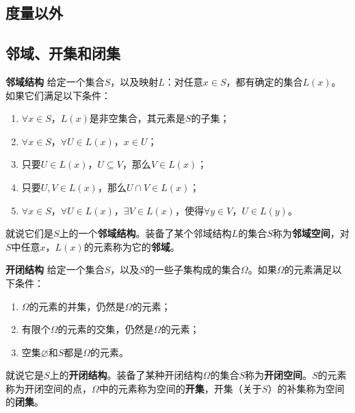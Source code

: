 \documentclass[12pt,UTF8,fontset=none]{ctexbook}
\begin{document}
\begin{appendix}

\chapter{度量以外}

\section{邻域、开集和闭集}

\begin{df}{\textbf{邻域结构}}\label{df:a-0-0}
    给定一个集合$S$，以及映射$L$：对任意$x\in S$，都有确定的集合$L(x)$。如果它们满足以下条件：
    \begin{enumerate}
        \item $\forall x\in S$，$L(x)$是非空集合，其元素是$S$的子集；
        \item $\forall x\in S$，$\forall U \in L(x)$，$x\in U$；
        \item 只要$U\in L(x)$，$U\subseteq V$，那么$V\in L(x)$；
        \item 只要$U, V\in L(x)$，那么$U\cap V \in L(x)$；
        \item $\forall x\in S$，$\forall U\in L(x)$，$\exists V \in L(x)$，使得$\forall y\in V$，$U\in L(y)$。
    \end{enumerate}
    就说它们是$S$上的一个\textbf{邻域结构}。装备了某个邻域结构$L$的集合$S$称为\textbf{邻域空间}，对$S$中任意$x$，$L(x)$的元素称为它的\textbf{邻域}。
\end{df}

\begin{df}{\textbf{开闭结构}}\label{df:a-0-1}
    给定一个集合$S$，以及$S$的一些子集构成的集合$\Omega$。如果$\Omega$的元素满足以下条件：
    \begin{enumerate}
        \item $\Omega$的元素的并集，仍然是$\Omega$的元素；
        \item 有限个$\Omega$的元素的交集，仍然是$\Omega$的元素；
        \item 空集$\varnothing$和$S$都是$\Omega$的元素。
    \end{enumerate}
    就说它是$S$上的\textbf{开闭结构}。装备了某种开闭结构$\Omega$的集合$S$称为\textbf{开闭空间}。$S$的元素称为开闭空间的点，$\Omega$中的元素称为空间的\textbf{开集}，开集（关于$S$）的补集称为空间的\textbf{闭集}。
\end{df}


\end{appendix}
\end{document}
